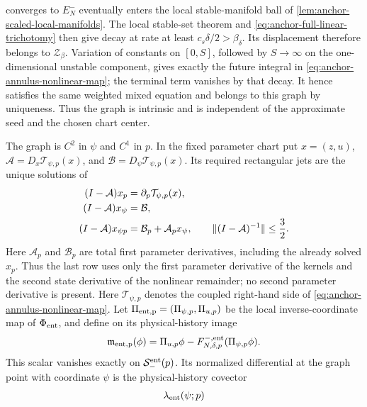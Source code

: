 \begin{lemma}
converges to \(E_N^-\) eventually enters the local stable-manifold ball of
\cref{lem:anchor-scaled-local-manifolds}.  The local stable-set theorem and
\cref{eq:anchor-full-linear-trichotomy} then give decay at rate at least
\(c_s\delta/2>\beta_\delta\).  Its displacement therefore belongs to
\(\mathscr Z_\beta\).  Variation of constants on \([0,S]\), followed by
\(S\to\infty\) on the one-dimensional unstable component, gives exactly
the future integral in \cref{eq:anchor-annulus-nonlinear-map}; the terminal
term vanishes by that decay.  It hence satisfies the same weighted mixed
equation and belongs to this graph by uniqueness.  Thus the graph is
intrinsic and is independent of the approximate seed and the chosen chart
center.

The graph is \(C^2\) in \(\psi\) and \(C^1\) in \(p\).  In the fixed
parameter chart put \(x=(z,u)\),
\(\mathcal A=D_x\mathcal T_{\psi,p}(x)\), and
\(\mathcal B=D_\psi\mathcal T_{\psi,p}(x)\).  Its required rectangular
jets are the unique solutions of
\begin{align}
 (I-\mathcal A)x_p&=\partial_p\mathcal T_{\psi,p}(x),\notag\\
 (I-\mathcal A)x_\psi&=\mathcal B,\notag\\
 (I-\mathcal A)x_{\psi p}
 &=\mathcal B_p+\mathcal A_p x_\psi,
 \qquad
 \|(I-\mathcal A)^{-1}\|\le\frac32 .                \label{eq:anchor-annulus-jet-equations}
\end{align}
Here \(\mathcal A_p\) and \(\mathcal B_p\) are total first parameter
derivatives, including the already solved \(x_p\).  Thus the last row uses
only the first parameter derivative of the kernels and the second state
derivative of the nonlinear remainder; no second parameter derivative is
present.
Here \(\mathcal T_{\psi,p}\) denotes the coupled right-hand side of
\cref{eq:anchor-annulus-nonlinear-map}.  Let
\(\Pi_{\rm ent,p}=(\Pi_{\psi,p},\Pi_{u,p})\) be the local inverse-coordinate
map of \(\Phi_{\rm ent}\), and define on its physical-history image
\begin{equation}
 \mathfrak m_{\rm ent,p}(\phi)
 =\Pi_{u,p}\phi
   -F^{-,\rm ent}_{N,\delta,p}(\Pi_{\psi,p}\phi).
                                                               \label{eq:anchor-entry-membership-function}
\end{equation}
This scalar vanishes exactly on \(\mathcal S_-^{\rm ent}(p)\).  Its
normalized differential at the graph point with coordinate \(\psi\) is the
physical-history covector
\begin{align}
 \lambda_{\rm ent}(\psi;p)

\end{align}
\end{lemma}
